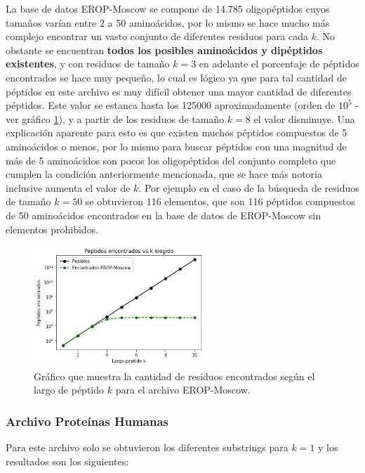 La base de datos EROP-Moscow se compone de 14.785 oligopéptidos cuyos tamaños varían entre 2 a 50 aminoácidos, por lo mismo se hace mucho más complejo encontrar un vasto conjunto de diferentes residuos para cada $k$. No obstante se encuentran \textbf{todos los posibles aminoácidos y dipéptidos existentes}, y con residuos de tamaño $k=3$ en adelante el porcentaje de péptidos encontrados se hace muy pequeño, lo cual es lógico ya que para tal cantidad de péptidos en este archivo es muy difícil obtener una mayor cantidad de diferentes péptidos. Este valor se estanca hasta los 125000 aproximadamente (orden de $10^{5}$ - ver gráfico \ref{fig:erop}), y a partir de los residuos de tamaño $k=8$ el valor disminuye. Una explicación aparente para esto es que existen muchos péptidos compuestos de 5 aminoácidos o menos, por lo mismo para buscar péptidos con una magnitud de más de 5 aminoácidos son pocos los oligopéptidos del conjunto completo que cumplen la condición anteriormente mencionada, que se hace más notoria inclusive aumenta el valor de $k$. Por ejemplo en el caso de la búsqueda de residuos de tamaño $k=50$ se obtuvieron 116 elementos, que son 116 péptidos compuestos de 50 aminoácidos encontrados en la base de datos de EROP-Moscow sin elementos prohibidos.

\begin{figure}[!htb]
    \centering
    \includegraphics[width=0.6\textwidth]{./images/eropv1.png}
    \caption{Gráfico que muestra la cantidad de residuos encontrados según el largo de péptido $k$ para el archivo EROP-Moscow.}
    \label{fig:erop}
\end{figure}


\subsubsection{Archivo Proteínas Humanas}

Para este archivo solo se obtuvieron los diferentes substrings para $k=1$ y los resultados son los siguientes:

